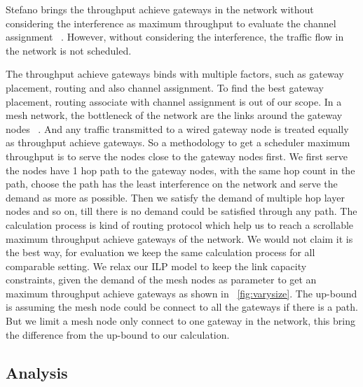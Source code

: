 Stefano brings the throughput achieve gateways in the network without considering the interference as maximum throughput to evaluate the channel assignment ~\cite{avallone2008channel}. 
However, without considering the interference, the traffic flow in the network is not scheduled.

The throughput achieve gateways binds with multiple factors, such as gateway placement, routing and also channel assignment.
To find the best gateway placement, routing associate with channel assignment is out of our scope. 
In a mesh network, the bottleneck of the network are the links around the gateway nodes ~\cite{robinson2010deploying}. 
And any traffic transmitted to a wired gateway node is treated equally as throughput achieve gateways. 
So a methodology to get a scheduler maximum throughput is to serve the nodes close to the gateway nodes first.
We first serve the nodes have 1 hop path to the gateway nodes, with the same hop count in the path, choose the path has the least interference on the network and serve the demand as more as possible. 
Then we satisfy the demand of multiple hop layer nodes and so on, till there is no demand could be satisfied through any path.
The calculation process is kind of routing protocol which help us to reach a scrollable maximum throughput achieve gateways of the network. 
We would not claim it is the best way, for evaluation we keep the same calculation process for all comparable setting.
We relax our ILP model to keep the link capacity constraints, given the demand of the mesh nodes as parameter to get an maximum throughput achieve gateways as shown in ~\ref{fig:varysize}. The up-bound is assuming the mesh node could be connect to all the gateways if there is a path. But we limit a mesh node only connect to one gateway in the network, this bring the difference from the up-bound to our calculation.



\subsection{Analysis}
\label{subsec:analysis}

